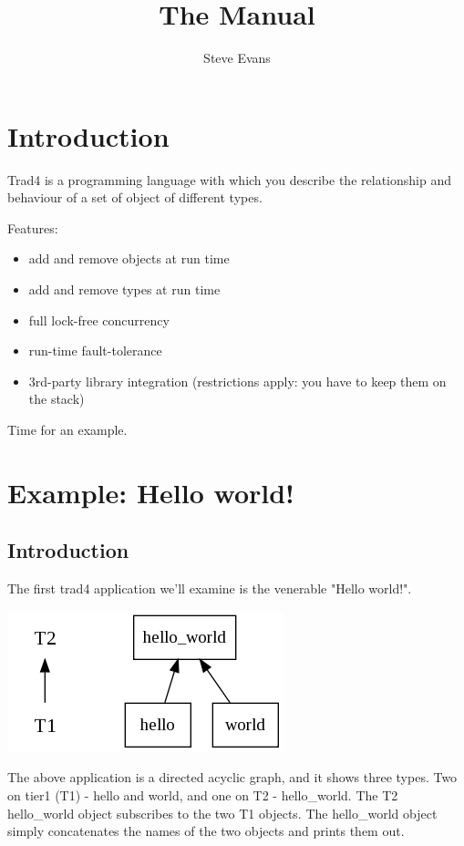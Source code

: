 \documentclass{report}
\begin{document}
\title{The Manual}
\author{Steve Evans}
\maketitle

\setcounter{tocdepth}{1}
\tableofcontents

\chapter{Introduction}

Trad4 is a programming language with which you describe the relationship and behaviour of a set of object of different types. 

Features:

\begin{itemize}
\item add and remove objects at run time
\item add and remove types at run time
\item full lock-free concurrency
\item run-time fault-tolerance
\item 3rd-party library integration (restrictions apply: you have to keep them on the stack)
\end{itemize}

Time for an example.

\chapter{Example: Hello world!}

\section{Introduction}

The first trad4 application we'll examine is the venerable "Hello world!".

\includegraphics[scale=0.5]{helloworldabstract.png}

The above application is a directed acyclic graph, and it shows three types. Two on tier1 (T1) - hello and world, and one on T2 - hello_world. The T2 hello_world object subscribes to the two T1 objects. The hello_world object simply concatenates the names of the two objects and prints them out.
\end{document}
